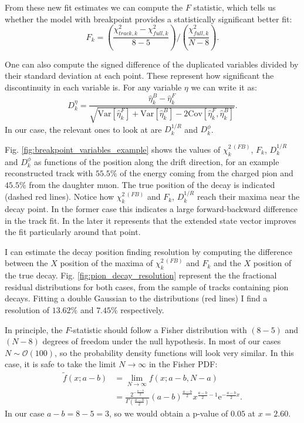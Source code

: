 From these new fit estimates we can compute the $F$ statistic, which tells us whether the model with breakpoint provides a statistically significant better fit:
\begin{equation}
	F_{k}=\left(\frac{\chi^{2}_{track,k}-\chi^{2}_{full,k}}{8-5}\right)/\left(\frac{\chi^{2}_{full,k}}{N-8}\right).
\end{equation}

One can also compute the signed difference of the duplicated variables divided by their standard deviation at each point. These represent how significant the discontinuity in each variable is. For any variable $\eta$ we can write it as:
\begin{equation}
	D^{\eta}_{k} = \frac{\hat{\eta}^{B}_{k}-\hat{\eta}^{F}_{k}}{\sqrt{\mathrm{Var}[\hat{\eta}^{F}_{k}]+\mathrm{Var}[\hat{\eta}^{B}_{k}]-2\mathrm{Cov}[\hat{\eta}^{F}_{k}, \hat{\eta}^{B}_{k}]}}.
\end{equation}
In our case, the relevant ones to look at are $D^{1/R}_{k}$ and $D^{\phi}_{k}$.

Fig. \ref{fig:breakpoint_variables_example} shows the values of $\chi^{2 \ (FB)}_{k}$, $F_{k}$, $D^{1/R}_{k}$ and $D^{\phi}_{k}$ as functions of the position along the drift direction, for an example reconstructed track with $55.5\%$ of the energy coming from the charged pion and $45.5\%$ from the daughter muon. The true position of the decay is indicated (dashed red lines). Notice how $\chi^{2 \ (FB)}_{k}$ and $F_{k}$, $D^{1/R}_{k}$ reach their maxima near the decay point. In the former case this indicates a large forward-backward difference in the track fit. In the later it represents that the extended state vector improves the fit particularly around that point.

I can estimate the decay position finding resolution by computing the difference between the $X$ position of the maxima of $\chi^{2 \ (FB)}_{k}$ and $F_{k}$ and the $X$ position of the true decay. Fig. \ref{fig:pion_decay_resolution} represent the  the fractional residual distributions for both cases, from the sample of tracks containing pion decays. Fitting a double Gaussian to the distributions (red lines) I find a resolution of $13.62\%$ and $7.45\%$ respectively.

In principle, the $F$-statistic should follow a Fisher distribution with $(8-5)$ and $(N-8)$ degrees of freedom under the null hypothesis. In most of our cases $N\sim\mathcal{O}(100)$, so the probability density functions will look very similar. In this case, it is safe to take the limit $N\rightarrow\infty$ in the Fisher PDF:
\begin{equation}
	\begin{split}
		\tilde{f}(x;a-b)&=\lim_{N \rightarrow \infty} f(x;a-b,N-a)\\
		&= \frac{2^{-\frac{a-b}{2}}}{\Gamma\left(\frac{a-b}{2}\right)}\left(a-b\right)^{\frac{a-b}{2}}x^{\frac{a-b}{2}-1}\mathrm{e}^{-\frac{a-b}{2}x}.
	\end{split}
\end{equation}
In our case $a-b = 8-5 = 3$, so we would obtain a p-value of $0.05$ at $x=2.60$.

